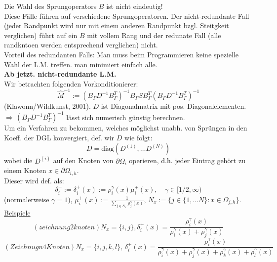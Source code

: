 Die Wahl des Sprungoperators $B$ ist nicht eindeutig! \\
Diese Fälle führen auf verschiedene Sprungoperatoren. Der nicht-redundante Fall (jeder Randpunkt wird nur mit einem anderen Randpunkt bzgl. Steitgkeit verglichen) führt auf ein $B$ mit vollem Rang und der redunate Fall (alle randkntoen werden entsprechend verglichen) nicht. \\
Vorteil des redundanten Falls: Man muss beim Programmieren keine spezielle Wahl der L.M. treffen. man minimiert einfach alle.\\
\textbf{Ab jetzt. nicht-redundante L.M. }\\
Wir betrachten folgenden Vorkonditionierer:
\[\hat M^{-1} := (B_\Gamma D^{-1} B^T_\Gamma )^{-1} B_\Gamma S B^T_\Gamma (B_\Gamma D^{-1} B^T_\Gamma)^{-1} \]
(Klawonn/Wildkunst, 2001). $D$ ist Diagonalmatrix mit pos. Diagonalelementen.\\
$\Rightarrow \, (B_\Gamma D^{-1}B^T_\Gamma)^{-1} $ lässt sich numerisch günstig berechnen.\\
Um ein Verfahren zu bekommen, welches möglichst unabh. von Sprüngen in den Koeff. der DGL konvergiert, def. wir $D$ wie folgt:
\[ D= \text{diag}\left( D^{(1)},\dots D^{(N)} \right) \]
wobei die $D^{(i)}$ auf den Knoten von $\partial \Omega_i$ operieren, d.h. jeder Eintrag gehört zu einem Knoten $x \in \partial \Omega_{i,h}$.\\
Dieser wird def. als:
\[ \delta^+_i := \delta^+_i (x) := \rho^\gamma_i(x)\mu^+_i(x), \quad \gamma \in [1/2,\infty) \]
(normalerweise $\gamma=1$), $\mu^+_i(x) :=\frac{1} { \sum_{j \in N_x} \rho^\gamma_j (x)} ,\, N_x := \{ j \in \{ 1,\dots N\} : x \in \Omega_{j,h} \}$.\\
\underline{Beispiele}\\
\[ (zeichnung 2 knoten)  N_x=\{i,j\} , \delta^+_i(x)=\frac{\rho^\gamma_i(x) }{\rho^\gamma_i(x)  + \rho^\gamma_j(x) } \]
\[ (Zeichnugn 4 Knoten) N_x=\{i,j,k,l \}, \,  \delta^+_i(x)=\frac{\rho^\gamma_i(x) }{\rho^\gamma_i(x)  + \rho^\gamma_j(x) + \rho^\gamma_k(x)  + \rho^\gamma_l(x) } \]






